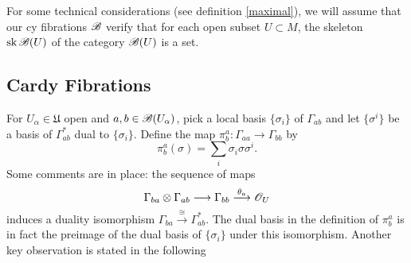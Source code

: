 \begin{obs}
  For some technical considerations (see definition \ref{maximal}), we
  will assume that our {\sc cy} fibrations $\mathscr{B}$ verify that for each
  open subset $U\subset M$, the skeleton $\operatorname{sk}\mathscr{B}(U)$ of the
  category $\mathscr{B}(U)$ is a set.
\end{obs}


\subsection{Cardy Fibrations}

For $U_\alpha \in \mathfrak{U}$ open and $a,b\in \mathscr{B}(U_\alpha )$,
pick a local basis $\{\sigma_i\}$ of $\Gamma_{ab}$ and let
$\{\sigma^i\}$ be a basis of $\Gamma_{ab}^*$ dual to
$\{\sigma_i\}$. Define the map $\pi^a_b:\Gamma_{aa}\to \Gamma_{bb}$ by
$$\pi^a_b(\sigma )=\sum_i\sigma_i\sigma \sigma^i.$$
Some comments are in place: the sequence of maps
\begin{equation}\label{duality}
  \Gamma_{ba}\otimes \Gamma_{ab}\longrightarrow \Gamma_{bb}\stackrel{\theta_a}{\longrightarrow}\mathscr{O}_U
\end{equation}
induces a duality isomorphism
$\Gamma_{ba}\stackrel{\cong}{\longrightarrow}\Gamma_{ab}^*$. The dual
basis in the definition of $\pi_b^a$ is in fact the preimage of the
dual basis of $\{\sigma_i\}$ under this isomorphism. Another key
observation is stated in the following

